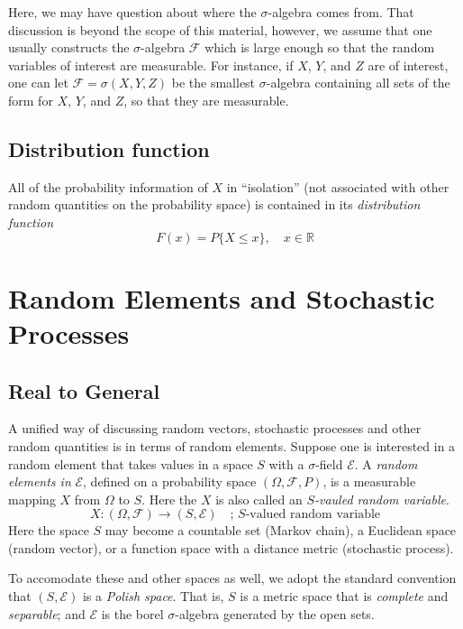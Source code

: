 \documentclass[twoside]{article}
\theoremstyle{definition}
\theoremstyle{remark}
\theoremstyle{remark}
\begin{document}
Here, we may have question about where the $\sigma$-algebra comes from.
That discussion is beyond the scope of this material, however, we assume
that one usually constructs the $\sigma$-algebra $\mathcal{F}$ which is
large enough so that the random variables of interest are measurable. For
instance, if $X$, $Y$, and $Z$ are of interest, one can let $\mathcal{F} =
\sigma(X, Y, Z)$ be the smallest $\sigma$-algebra containing all sets of
the form for $X$, $Y$, and $Z$, so that they are measurable.

\subsection{Distribution function}
All of the probability information of $X$ in ``isolation'' (not associated
with other random quantities on the probability space) is contained in its
\textit{distribution function}
\begin{equation}
  F(x) = P{\{ X \leq x \}}, \quad x \in \mathbb{R}
\end{equation}

\section{Random Elements and Stochastic Processes}

\subsection{Real to General}
A unified way of discussing random vectors, stochastic processes and other
random quantities is in terms of random elements. Suppose one is interested
in a random element that takes values in a space $S$ with a $\sigma$-field
$\mathcal{E}$. A \textit{random elements in} $\mathcal{E}$, defined on a
probability space $(\Omega, \mathcal{F}, P)$, is a measurable mapping $X$
from $\Omega$ to $S$. Here the $X$ is also called an \textit{$S$-vauled
random variable}.
\begin{equation}
  X: (\Omega, \mathcal{F}) \rightarrow (S, \mathcal{E}) \quad \textrm{; $S$-valued random variable}
\end{equation}
Here the space $S$ may become a countable set (Markov chain), a Euclidean space
(random vector), or a function space with a distance metric (stochastic process).

To accomodate these and other spaces as well, we adopt the standard convention
that $(S, \mathcal{E})$ is a \textit{Polish space}. That is, $S$ is a metric
space that is \textit{complete} and \textit{separable}; and $\mathcal{E}$ is
the borel $\sigma$-algebra generated by the open sets.
\end{document}
